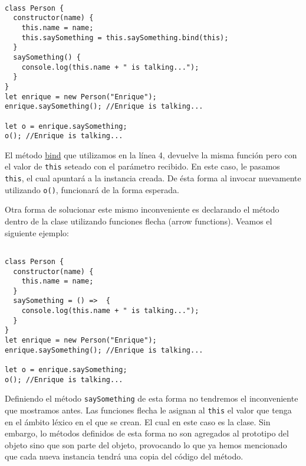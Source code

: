 \documentclass[a4paper, oneside, titlepage, 12pt]{paper}
\begin{document}
\begin{verbatim}

class Person {
  constructor(name) {
    this.name = name;
    this.saySomething = this.saySomething.bind(this);    
  }
  saySomething() {
    console.log(this.name + " is talking...");
  }
}
let enrique = new Person("Enrique");
enrique.saySomething(); //Enrique is talking...

let o = enrique.saySomething; 
o(); //Enrique is talking...
\end{verbatim}

El método \href{https://developer.mozilla.org/es/docs/Web/JavaScript/Reference/Global_Objects/Function/bind}{bind} que utilizamos en la línea 4, devuelve la misma función pero con el valor de \texttt{this} seteado con el parámetro recibido. En este caso, le pasamos \texttt{this}, el cual apuntará a la instancia creada. De ésta forma al invocar nuevamente utilizando \texttt{o()}, funcionará de la forma esperada.
\newline

Otra forma de solucionar este mismo inconveniente es declarando el método dentro de la clase utilizando funciones flecha (arrow functions). Veamos el siguiente ejemplo:

\begin{verbatim}

class Person {
  constructor(name) {
    this.name = name;
  }
  saySomething = () =>  {
    console.log(this.name + " is talking...");
  }
}
let enrique = new Person("Enrique");
enrique.saySomething(); //Enrique is talking...

let o = enrique.saySomething;
o(); //Enrique is talking...
\end{verbatim}

Definiendo el método \texttt{saySomething} de esta forma no tendremos el inconveniente que mostramos antes. Las funciones flecha le asignan al \texttt{this} el valor que tenga en el ámbito léxico en el que se crean. El cual en este caso es la clase. Sin embargo, lo métodos definidos de esta forma no son agregados al prototipo del objeto sino que son parte del objeto, provocando lo que ya hemos mencionado que cada nueva instancia tendrá una copia del código del método.
\end{document}
